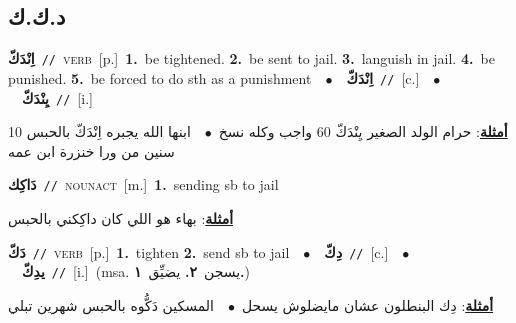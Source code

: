 \documentclass[10pt,a4paper,twoside]{article} %
\begin{document}
\begin{multicols}{2}
\vspace{-3mm}
\subsection*{\color{blue}\foreignlanguage{arabic}{د.ك.ك}\color{blue}{}} 

{\setlength\topsep{0pt}\textbf{\foreignlanguage{arabic}{اِنْدَكّ}}\ {\color{gray}\texttt{//}\color{black}}\ \textsc{verb}\ [p.]\ \textbf{1.}~be tightened.  \textbf{2.}~be sent to jail.  \textbf{3.}~languish in jail.  \textbf{4.}~be punished.  \textbf{5.}~be forced to do sth as a punishment\ \ $\bullet$\ \ \setlength\topsep{0pt}\textbf{\foreignlanguage{arabic}{اِنْدَكّ}}\ {\color{gray}\texttt{//}\color{black}}\ [c.]\ \ $\bullet$\ \ \setlength\topsep{0pt}\textbf{\foreignlanguage{arabic}{يِنْدَكّ}}\ {\color{gray}\texttt{//}\color{black}}\ [i.]\  \begin{flushright}\color{gray}\foreignlanguage{arabic}{\textbf{\underline{\foreignlanguage{arabic}{أمثلة}}}: حرام الولد الصغير يِنْدَكّ 60 واجب وكله نسخ\ $\bullet$\ \  ابنها الله يجبره اِنْدَكّ بالحبس 10 سنين من ورا خنزرة ابن عمه}\end{flushright}\color{black}} \vspace{2mm}

{\setlength\topsep{0pt}\textbf{\foreignlanguage{arabic}{دَاكِك}}\ {\color{gray}\texttt{//}\color{black}}\ \textsc{noun\textunderscore act}\ [m.]\ \textbf{1.}~sending sb to jail\  \begin{flushright}\color{gray}\foreignlanguage{arabic}{\textbf{\underline{\foreignlanguage{arabic}{أمثلة}}}: بهاء هو اللي كان داكِكني بالحبس}\end{flushright}\color{black}} \vspace{2mm}

{\setlength\topsep{0pt}\textbf{\foreignlanguage{arabic}{دَكّ}}\ {\color{gray}\texttt{//}\color{black}}\ \textsc{verb}\ [p.]\ \textbf{1.}~tighten  \textbf{2.}~send sb to jail\ \ $\bullet$\ \ \setlength\topsep{0pt}\textbf{\foreignlanguage{arabic}{دِكّ}}\ {\color{gray}\texttt{//}\color{black}}\ [c.]\ \ $\bullet$\ \ \setlength\topsep{0pt}\textbf{\foreignlanguage{arabic}{يدِكّ}}\ {\color{gray}\texttt{//}\color{black}}\ [i.]\ \color{gray}(msa. \foreignlanguage{arabic}{يسجن}~\foreignlanguage{arabic}{\textbf{٢.}}  \foreignlanguage{arabic}{يضيِّق}~\foreignlanguage{arabic}{\textbf{١.}})\color{black}\  \begin{flushright}\color{gray}\foreignlanguage{arabic}{\textbf{\underline{\foreignlanguage{arabic}{أمثلة}}}: دِك البنطلون عشان مايضلوش يسحل\ $\bullet$\ \  المسكين دَكُّوه بالحبس شهرين تبلي}\end{flushright}\color{black}} \vspace{2mm}


\end{multicols}
\end{document}
